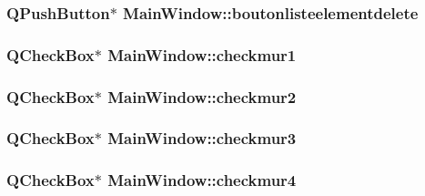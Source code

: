 \hypertarget{class_main_window_a0300f02a442c333e918e229817b27ef2}{
\subsubsection[{boutonlisteelementdelete}]{\setlength{\rightskip}{0pt plus 5cm}Q\+Push\+Button$\ast$ Main\+Window\+::boutonlisteelementdelete\hspace{0.3cm}{\ttfamily [private]}}}\label{class_main_window_a0300f02a442c333e918e229817b27ef2}
\hypertarget{class_main_window_aabce537f4ce40332b2411e31218abf37}{
\subsubsection[{checkmur1}]{\setlength{\rightskip}{0pt plus 5cm}Q\+Check\+Box$\ast$ Main\+Window\+::checkmur1\hspace{0.3cm}{\ttfamily [private]}}}\label{class_main_window_aabce537f4ce40332b2411e31218abf37}
\hypertarget{class_main_window_a9311b2ff986d09836c8e385348acd571}{
\subsubsection[{checkmur2}]{\setlength{\rightskip}{0pt plus 5cm}Q\+Check\+Box$\ast$ Main\+Window\+::checkmur2\hspace{0.3cm}{\ttfamily [private]}}}\label{class_main_window_a9311b2ff986d09836c8e385348acd571}
\hypertarget{class_main_window_a71169e71f8f50fc126c8cdaad981cad7}{
\subsubsection[{checkmur3}]{\setlength{\rightskip}{0pt plus 5cm}Q\+Check\+Box$\ast$ Main\+Window\+::checkmur3\hspace{0.3cm}{\ttfamily [private]}}}\label{class_main_window_a71169e71f8f50fc126c8cdaad981cad7}
\hypertarget{class_main_window_a2e8fae74cfc9045da4dfcba506aacca4}{
\subsubsection[{checkmur4}]{\setlength{\rightskip}{0pt plus 5cm}Q\+Check\+Box$\ast$ Main\+Window\+::checkmur4\hspace{0.3cm}{\ttfamily [private]}}}\label{class_main_window_a2e8fae74cfc9045da4dfcba506aacca4}
